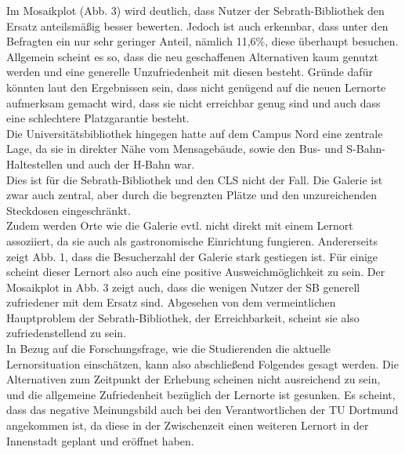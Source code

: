 \documentclass[11pt, a4paper]{article}
\begin{document}
Im Mosaikplot (Abb. 3) wird deutlich, dass Nutzer der Sebrath-Bibliothek den Ersatz anteilsmäßig besser bewerten. Jedoch ist auch erkennbar, dass unter den Befragten ein nur sehr geringer Anteil, nämlich 11,6\%, diese überhaupt besuchen.\\
Allgemein scheint es so, dass die neu geschaffenen Alternativen kaum genutzt werden und eine generelle Unzufriedenheit mit diesen besteht. Gründe dafür könnten laut den Ergebnissen sein, dass nicht genügend auf die neuen Lernorte aufmerksam gemacht wird, dass sie nicht erreichbar genug sind und auch dass eine schlechtere Platzgarantie besteht.\\
Die Universitätsbibliothek hingegen hatte auf dem Campus Nord eine zentrale Lage, da sie in direkter Nähe vom Mensagebäude, sowie den Bus- und S-Bahn-Haltestellen und auch der H-Bahn war. \\
Dies ist für die Sebrath-Bibliothek und den CLS nicht der Fall. Die Galerie ist zwar auch zentral, aber durch die begrenzten Plätze und den unzureichenden Steckdosen eingeschränkt.\\
Zudem werden Orte wie die Galerie evtl. nicht direkt mit einem Lernort assoziiert, da sie auch als gastronomische Einrichtung fungieren.
Andererseits zeigt Abb. 1, dass die Besucherzahl der Galerie stark gestiegen ist.
Für einige scheint dieser Lernort also auch eine positive Ausweichmöglichkeit zu sein.
Der Mosaikplot in Abb. 3 zeigt auch, dass die wenigen Nutzer der SB generell zufriedener mit dem Ersatz sind. Abgesehen von dem vermeintlichen Hauptproblem der Sebrath-Bibliothek, der Erreichbarkeit, scheint sie also zufriedenstellend zu sein.\\
In Bezug auf die Forschungsfrage, wie die Studierenden die aktuelle Lernorsituation einschätzen, kann also abschließend Folgendes gesagt werden. Die Alternativen zum Zeitpunkt der Erhebung scheinen nicht ausreichend zu sein, und die allgemeine Zufriedenheit bezüglich der Lernorte ist gesunken.
Es scheint, dass das negative Meinungsbild auch bei den Verantwortlichen der TU Dortmund angekommen ist, da diese in der Zwischenzeit einen weiteren Lernort in der Innenstadt geplant und eröffnet haben.\\




\newpage
\end{document}
